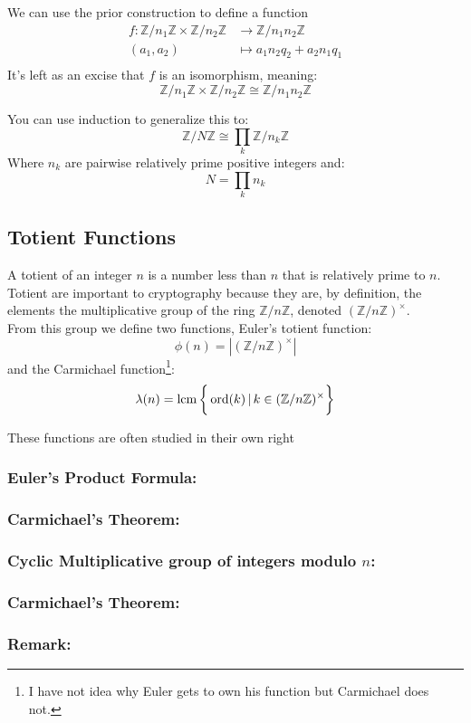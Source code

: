 We can use the prior construction to define a function 
\begin{equation*}
\begin{aligned}
f:\mathbb{Z}/n_1\mathbb{Z}\times\mathbb{Z}/n_2\mathbb{Z} &\rightarrow \mathbb{Z}/n_1n_2\mathbb{Z}\\
(a_1,a_2)&\mapsto a_1n_2q_2+a_2n_1q_1\\
\end{aligned}
\end{equation*}
It's left as an excise that $f$ is an isomorphism, meaning:
\[\mathbb{Z}/n_1\mathbb{Z}\times\mathbb{Z}/n_2\mathbb{Z} \cong \mathbb{Z}/n_1n_2\mathbb{Z}\]

You can use induction to generalize this to:
\[\mathbb{Z}/N\mathbb{Z} \cong \prod_k\mathbb{Z}/n_k\mathbb{Z}\]
Where $n_k$ are pairwise relatively prime positive integers and:
\[N =\prod_k n_k \]
\subsection{Totient Functions}
\label{appx:torient}
A totient of an integer $n$ is a number less than $n$ that is relatively prime to $n$.
Totient are important to cryptography because they are, by definition, the elements the multiplicative group of the ring $\mathbb{Z}/n\mathbb{Z}$,
denoted $(\mathbb{Z}/n\mathbb{Z})^\times$.
\\

From this group we define two functions,
Euler's totient function:
\[\phi(n) = |(\mathbb{Z}/n\mathbb{Z})^\times|\]
and the Carmichael function\footnote{I have not idea why Euler gets to own his function but Carmichael does not.}:
\[\lambda(n) = \operatorname{lcm}\bigg\{\operatorname{ord}(k)\,|\, k\in(\mathbb{Z}/n\mathbb{Z})^\times\bigg\}\]

These functions are often studied in their own right

\subsubsection{Euler's Product Formula:}
\subsubsection{Carmichael's Theorem:}
\subsubsection{Cyclic Multiplicative group of integers modulo $n$:}
\label{appx:cycle-multiplicative-group}
\subsubsection{Carmichael's Theorem:}
\subsubsection{Remark:}
